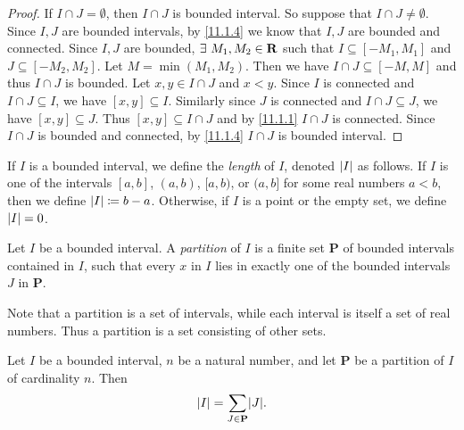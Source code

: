 \begin{proof}
  If \(I \cap J = \emptyset\), then \(I \cap J\) is bounded interval.
  So suppose that \(I \cap J \neq \emptyset\).
  Since \(I, J\) are bounded intervals, by \cref{11.1.4} we know that \(I, J\) are bounded and connected.
  Since \(I, J\) are bounded, \(\exists\ M_1, M_2 \in \mathbf{R}\) such that \(I \subseteq [-M_1, M_1]\) and \(J \subseteq [-M_2, M_2]\).
  Let \(M = \min(M_1, M_2)\).
  Then we have \(I \cap J \subseteq [-M, M]\) and thus \(I \cap J\) is bounded.
  Let \(x, y \in I \cap J\) and \(x < y\).
  Since \(I\) is connected and \(I \cap J \subseteq I\), we have \([x, y] \subseteq I\).
  Similarly since \(J\) is connected and \(I \cap J \subseteq J\), we have \([x, y] \subseteq J\).
  Thus \([x, y] \subseteq I \cap J\) and by \cref{11.1.1} \(I \cap J\) is connected.
  Since \(I \cap J\) is bounded and connected, by \cref{11.1.4} \(I \cap J\) is bounded interval.
\end{proof}

\setcounter{theorem}{7}
\begin{definition}\label{11.1.8}
  If \(I\) is a bounded interval, we define the \emph{length} of \(I\), denoted \(\left\lvert I\right\rvert\) as follows.
  If \(I\) is one of the intervals \([a, b]\), \((a, b)\), \([a, b)\), or \((a, b]\) for some real numbers \(a < b\), then we define \(\left\lvert I\right\rvert \coloneqq b - a\).
  Otherwise, if \(I\) is a point or the empty set, we define \(\left\lvert I\right\rvert = 0\).
\end{definition}

\setcounter{theorem}{9}
\begin{definition}[Partitions]\label{11.1.10}
  Let \(I\) be a bounded interval.
  A \emph{partition} of \(I\) is a finite set \(\mathbf{P}\) of bounded intervals contained in \(I\), such that every \(x\) in \(I\) lies in exactly one of the bounded intervals \(J\) in \(\mathbf{P}\).
\end{definition}

\begin{remark}\label{11.1.11}
  Note that a partition is a set of intervals, while each interval is itself a set of real numbers.
  Thus a partition is a set consisting of other sets.
\end{remark}

\setcounter{theorem}{12}
\begin{theorem}\label{11.1.13}
  Let \(I\) be a bounded interval, \(n\) be a natural number, and let \(\mathbf{P}\) be a partition of \(I\) of cardinality \(n\).
  Then
  \[
    \abs{I} = \sum_{J \in \mathbf{P}} \abs{J}.
  \]
\end{theorem}

